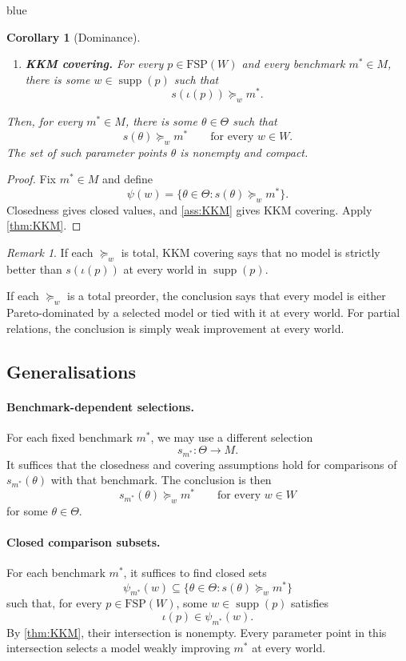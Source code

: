 \documentclass[11pt]{article}
\newtheorem{corollary}[theorem]{Corollary}
\theoremstyle{definition}
\theoremstyle{remark}
\newtheorem{remark}[theorem]{Remark}
\newcommand{\supp}{\operatorname{supp}}
\newenvironment{AIwritten}{\begin{color}{blue}}{\end{color}}
\begin{document}
\begin{AIwritten}
\begin{corollary}[Dominance]
\begin{enumerate}
		\item\label{ass:KKM} \textbf{KKM covering.}
		For every $p\in\mathrm{FSP}(W)$ and every
		benchmark $m^*\in M$, there is some
		$w\in\supp(p)$ such that
		\[
		s(\iota(p))\succeq_w m^*.
		\]
	\end{enumerate}
	Then, for every $m^*\in M$, there is some $\theta\in \Theta$
	such that
	\[
	s(\theta)\succeq_w m^*
	\qquad\text{for every }w\in W.
	\]
	The set of such parameter points $\theta$ is nonempty
	and compact.
\end{corollary}

\begin{proof}
	Fix $m^*\in M$ and define
	\[
	\psi(w)=\{\theta\in \Theta:s(\theta)\succeq_w m^*\}.
	\]
	Closedness gives closed values, and
	\ref{ass:KKM} gives KKM covering.
	Apply \cref{thm:KKM}.
\end{proof}

\begin{remark}
	If each $\succeq_w$ is total, KKM covering says
	that no model is strictly better than
	$s(\iota(p))$ at every world in $\supp(p)$.
	
	If each $\succeq_w$ is a total preorder, the
	conclusion says that every model is either
	Pareto-dominated by a selected model or tied
	with it at every world. For partial relations,
	the conclusion is simply weak improvement
	at every world.
\end{remark}

\subsection{Generalisations}

\paragraph{Benchmark-dependent selections.}
For each fixed benchmark $m^*$, we may use a different
selection
\[
s_{m^*}:\Theta\to M.
\]
It suffices that the closedness and covering assumptions
hold for comparisons of $s_{m^*}(\theta)$ with that benchmark.
The conclusion is then
\[
s_{m^*}(\theta)\succeq_w m^*
\qquad\text{for every }w\in W
\]
for some $\theta\in \Theta$.

\paragraph{Closed comparison subsets.}
For each benchmark $m^*$, it suffices to find closed sets
\[
\psi_{m^*}(w)
\subseteq
\{\theta\in \Theta:s(\theta)\succeq_w m^*\}
\]
such that, for every $p\in\mathrm{FSP}(W)$, some
$w\in\supp(p)$ satisfies
\[
\iota(p)\in\psi_{m^*}(w).
\]
By \cref{thm:KKM}, their intersection is nonempty.
Every parameter point in this intersection selects
a model weakly improving $m^*$ at every world.


\end{AIwritten}
\end{document}
